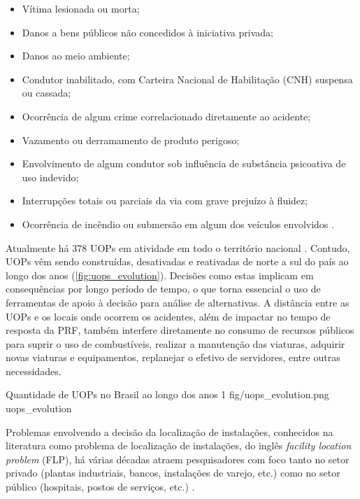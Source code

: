 \begin{itemize}
  \item Vítima lesionada ou morta;
  \item Danos a bens públicos não concedidos à iniciativa privada;
  \item Danos ao meio ambiente;
  \item Condutor inabilitado, com Carteira Nacional de Habilitação (CNH) suspensa ou cassada;
  \item Ocorrência de algum crime correlacionado diretamente ao acidente;
  \item Vazamento ou derramamento de produto perigoso;  
  \item Envolvimento de algum condutor sob influência de substância psicoativa de uso indevido;
  \item Interrupções totais ou parciais da via com grave prejuízo à fluidez;
  \item Ocorrência de incêndio ou submersão em algum dos veículos envolvidos \cite{UsuarioPRF}.
\end{itemize}


Atualmente há 378 UOPs em atividade em todo o território nacional \cite{UnidadesPRF}. Contudo, UOPs vêm sendo construídas, desativadas e reativadas de norte a sul do país ao longo dos anos (\autoref{fig:uops_evolution}). Decisões como estas implicam em consequências por longo período de tempo, o que torna essencial o uso de ferramentas de apoio à decisão para análise de alternativas. A distância entre as UOPs e os locais onde ocorrem os acidentes, além de impactar no tempo de resposta da PRF, também interfere diretamente no consumo de recursos públicos para suprir o uso de combustíveis, realizar a manutenção das viaturas, adquirir novas viaturas e equipamentos, replanejar o efetivo de servidores, entre outras necessidades.

\figura
{Quantidade de UOPs no Brasil ao longo dos anos}
{1}
{fig/uops_evolution.png}
{\textcite{ContasPRF2017}}
{uops_evolution}
{}
{}

Problemas envolvendo a decisão da localização de instalações, conhecidos na literatura como problema de localização de instalações, do inglês \textit{facility location problem} (FLP), há várias décadas atraem pesquisadores com foco tanto no setor privado (plantas industriais, bancos, instalações de varejo, etc.) como no setor público (hospitais, postos de serviços, etc.) \cite{Farahani2009}. 

